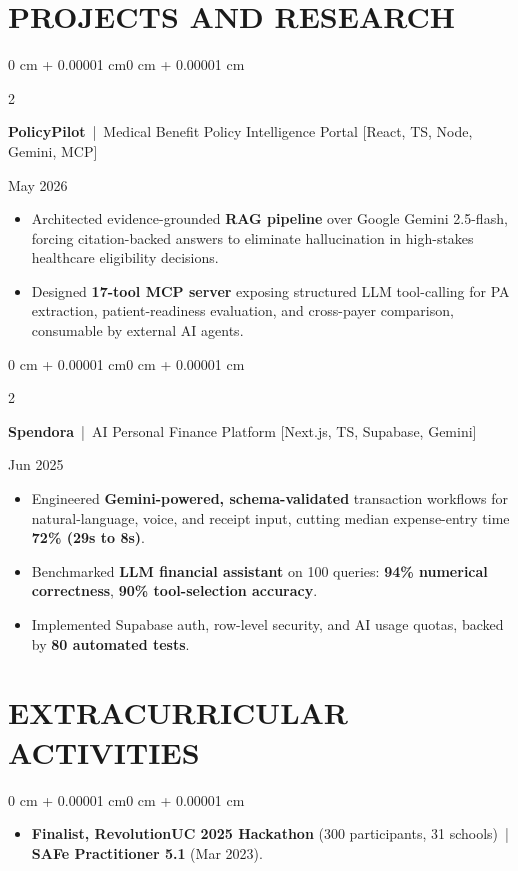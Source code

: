 \documentclass[10pt, letterpaper]{article}
\newenvironment{highlights}{
    \begin{itemize}[
        topsep=0.10 cm,
        parsep=0.06 cm,
        partopsep=0pt,
        itemsep=0.06 cm,
        leftmargin=12pt
    ]
}{
    \end{itemize}
}
\newenvironment{onecolentry}{
    \begin{adjustwidth}{0 cm + 0.00001 cm}{0 cm + 0.00001 cm}
}{
    \end{adjustwidth}
}
\newenvironment{twocolentry}[2][]{
    \onecolentry
    \def\secondColumn{#2}
    \setcolumnwidth{\fill, 4.5 cm}
    \begin{paracol}{2}
}{
    \switchcolumn \raggedleft \secondColumn
    \end{paracol}
    \endonecolentry
}
\begin{document}
\section{PROJECTS AND RESEARCH}
\begin{twocolentry}{May 2026}
\textbf{PolicyPilot} \,|\, Medical Benefit Policy Intelligence Portal [React, TS, Node, Gemini, MCP]
\end{twocolentry}
\begin{highlights}
  \item Architected evidence-grounded \textbf{RAG pipeline} over Google Gemini 2.5-flash, forcing citation-backed answers to eliminate hallucination in high-stakes healthcare eligibility decisions.
  \item Designed \textbf{17-tool MCP server} exposing structured LLM tool-calling for PA extraction, patient-readiness evaluation, and cross-payer comparison, consumable by external AI agents.
\end{highlights}

\vspace{0.12 cm}

\begin{twocolentry}{Jun 2025}
\textbf{Spendora} \,|\, AI Personal Finance Platform [Next.js, TS, Supabase, Gemini]
\end{twocolentry}
\begin{highlights}
  \item Engineered \textbf{Gemini-powered, schema-validated} transaction workflows for natural-language, voice, and receipt input, cutting median expense-entry time \textbf{72\% (29s to 8s)}.
  \item Benchmarked \textbf{LLM financial assistant} on 100 queries: \textbf{94\% numerical correctness}, \textbf{90\% tool-selection accuracy}.
  \item Implemented Supabase auth, row-level security, and AI usage quotas, backed by \textbf{80 automated tests}.
\end{highlights}

\section{EXTRACURRICULAR ACTIVITIES}
\begin{onecolentry}
\begin{highlights}
  \item \textbf{Finalist, RevolutionUC 2025 Hackathon} (300 participants, 31 schools) \,|\, \textbf{SAFe Practitioner 5.1} (Mar 2023).
\end{highlights}
\end{onecolentry}
\end{document}
